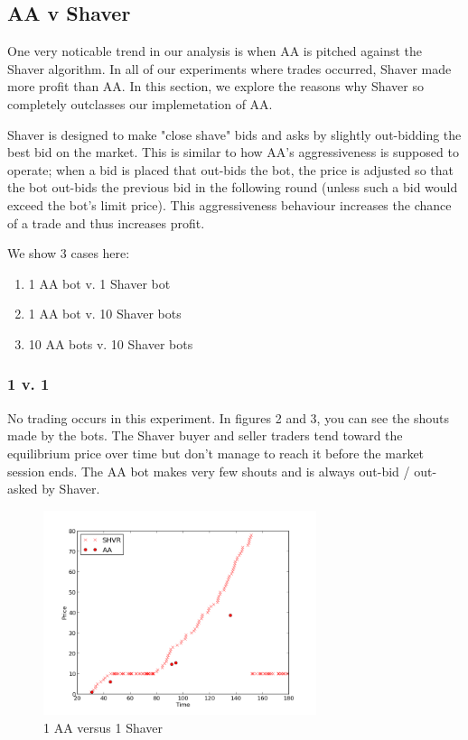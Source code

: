 \documentclass{acm_proc_article-sp}
\begin{document}
\subsection{AA v Shaver} One very noticable trend in our analysis is when AA
is pitched against the Shaver algorithm. In all of our experiments where trades
occurred, Shaver made more profit than AA. In this section, we explore the
reasons why Shaver so completely outclasses our implemetation of AA.

Shaver is designed to make "close shave" bids and asks by slightly out-bidding
the best bid on the market. This is similar to how AA's aggressiveness is
supposed to operate; when a bid is placed that out-bids the bot, the price is
adjusted so that the bot out-bids the previous bid in the following round
(unless such a bid would exceed the bot's limit price). This aggressiveness
behaviour increases the chance of a trade and thus increases profit.

We show 3 cases here:
\begin{enumerate}
\item 1 AA bot v. 1 Shaver bot
\item 1 AA bot v. 10 Shaver bots
\item 10 AA bots v. 10 Shaver bots
\end{enumerate}

\subsubsection{1 v. 1} No trading occurs in this experiment. In figures 2 and 3,
you can see the shouts made by the bots. The Shaver buyer and seller traders
tend toward the equilibrium price over time but don't manage to reach it before
the market session ends. The AA bot makes very few shouts and is always out-bid
/ out-asked by Shaver.

\begin{figure}[h!] \includegraphics[width=80mm]{SHVR1AA1_180_all_bids.png}
\caption {1 AA versus 1 Shaver}
\end{figure}
\end{document}
